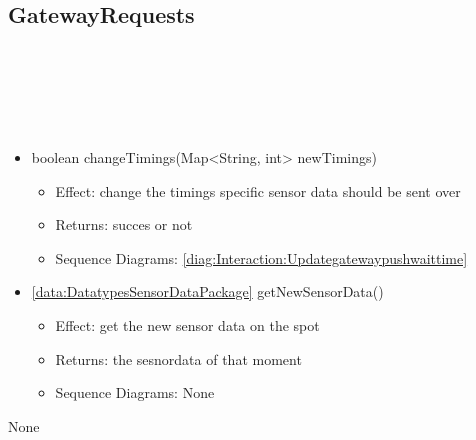   \subsection{GatewayRequests}\label{int:InterfacesGatewayRequests}
    \begin{description}
      \item[Provided by:] \iconcomponent{}~
      \item[Required by:] \iconcomponent{}~ 
      \item[Operations:] ~
    \begin{itemize}[noitemsep,nolistsep,leftmargin=-.25cm]
      \item \textsf{boolean changeTimings(Map\textless{}String, int\textgreater{} newTimings)}
        \begin{itemize}[noitemsep,nolistsep]
           \item Effect: change the timings specific sensor data should be sent over
 
           \item Returns: succes or not
           \item Sequence Diagrams: \cref{diag:Interaction:Updategatewaypushwaittime}
        \end{itemize}
      \item \textsf{\ref{data:DatatypesSensorDataPackage} getNewSensorData()}
        \begin{itemize}[noitemsep,nolistsep]
           \item Effect: get the new sensor data on the spot  
           \item Returns: the sesnordata of that moment
           \item Sequence Diagrams: None
        \end{itemize}
    \end{itemize}
      \item[Diagrams:] None
    \end{description}

